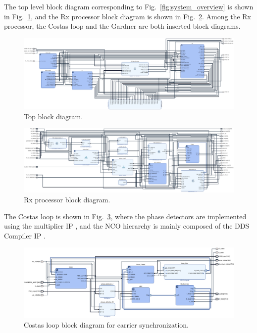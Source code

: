 \documentclass[journal,twoside]{IEEEtran}
\begin{document}
    The top level block diagram corresponding to Fig.~\ref{fig:system_overview} is shown in Fig.~\ref{fig:block_top},
    and the Rx processor block diagram is shown in Fig.~\ref{fig:block_rx}.
    Among the Rx processor, the Costas loop and the Gardner are both inserted block diagrams.
    \begin{figure}
      \includegraphics[width=\linewidth]{../schematic/top.pdf}
      \caption{Top block diagram.}
      \label{fig:block_top}
    \end{figure}
    \begin{figure}
      \includegraphics[width=\linewidth]{../schematic/Rx.pdf}
      \caption{Rx processor block diagram.}
      \label{fig:block_rx}
    \end{figure}

    The Costas loop is shown in Fig.~\ref{fig:block_costas_looop},
    where the phase detectors are implemented using the multiplier IP \cite{xilinx:pg108},
    and the NCO hierarchy is mainly composed of the DDS Compiler IP \cite{xilinx:pg141}.

    \begin{figure}
      \includegraphics[width=\linewidth]{../schematic/costas_loop.pdf}
      \caption{Costas loop block diagram for carrier synchronization.}
      \label{fig:block_costas_looop}
    \end{figure}
\end{document}

